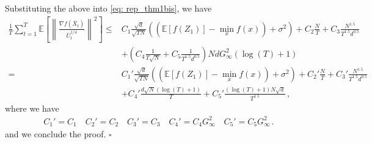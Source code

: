 \documentclass[11pt]{article}
\begin{document}
Substituting the above into \eqref{eq: rep_thm1bis}, we have 
\begin{align}%
	 \frac{1}{T}\sum_{t=1}^T  \mathbb E \left [\left\|\frac{\nabla f( \overline X_{t})}{\overline U_{t}^{1/4}}\right\|^2  \right] 
	\leq  & C_1 \frac{\sqrt{d}}{\sqrt{TN}} \left(( \mathbb E  [f( Z_{1})]  -  \min_x  f(x)) +    \sigma^2 \right)  +  C_2 \frac{N}{T}  +  C_3 \frac{N^{1.5}}{T^{1.5}d^{0.5}} 
	\nonumber \\
    &+  \left(C_4 \frac{1}{T\sqrt{N}} +  C_5   \frac{1}{T^{1.5}d^{0.5}}\right) 
NdG_{\infty}^2 (\log(T)+1) \nonumber \\
	=  & C_1' \frac{\sqrt{d}}{\sqrt{TN}} \left(( \mathbb E  [f( Z_{1})]  -  \min_x  f(x)) +    \sigma^2 \right)  +  C_2' \frac{N}{T}  +  C_3' \frac{N^{1.5}}{T^{1.5}d^{0.5}} 
	\nonumber \\
    &+  C_4' \frac{d\sqrt{N}(\log(T)+1)}{T} +  C_5'   \frac{(\log(T)+1)N\sqrt{d}}{T^{1.5}}\,, \nonumber
\end{align}
where we have 
\begin{align}
C_1' = C_1 \quad C_2' = C_2 \quad C_3' = C_3 \quad C_4' = C_4G_{\infty}^2 \quad C_5' = C_5 G_{\infty}^2 \, .
\end{align}
and we conclude the proof. \hfill $\square$





\vspace{0.2in}



\end{document}
